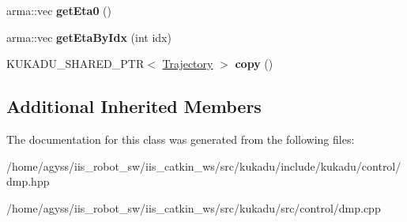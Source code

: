 \begin{DoxyCompactItemize}
\item 
arma\+::vec {\bfseries get\+Eta0} ()\hypertarget{classkukadu_1_1CartesianDMP_a1a973cebbac6ef7039ab1d5a22d56d94}{}\label{classkukadu_1_1CartesianDMP_a1a973cebbac6ef7039ab1d5a22d56d94}

\item 
arma\+::vec {\bfseries get\+Eta\+By\+Idx} (int idx)\hypertarget{classkukadu_1_1CartesianDMP_a7d296abeb41ad68cd9b2dd6ca41efd27}{}\label{classkukadu_1_1CartesianDMP_a7d296abeb41ad68cd9b2dd6ca41efd27}

\item 
K\+U\+K\+A\+D\+U\+\_\+\+S\+H\+A\+R\+E\+D\+\_\+\+P\+TR$<$ \hyperlink{classkukadu_1_1Trajectory}{Trajectory} $>$ {\bfseries copy} ()\hypertarget{classkukadu_1_1CartesianDMP_a9e4074fd82f6256d3b534015c03c3912}{}\label{classkukadu_1_1CartesianDMP_a9e4074fd82f6256d3b534015c03c3912}

\end{DoxyCompactItemize}
\subsection*{Additional Inherited Members}


The documentation for this class was generated from the following files\+:\begin{DoxyCompactItemize}
\item 
/home/agyss/iis\+\_\+robot\+\_\+sw/iis\+\_\+catkin\+\_\+ws/src/kukadu/include/kukadu/control/dmp.\+hpp\item 
/home/agyss/iis\+\_\+robot\+\_\+sw/iis\+\_\+catkin\+\_\+ws/src/kukadu/src/control/dmp.\+cpp\end{DoxyCompactItemize}
